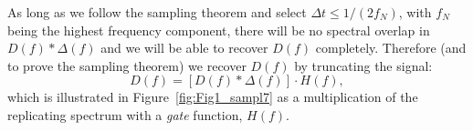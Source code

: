 As long as we follow the sampling theorem and select  $\Delta t \leq 1/(2 f_N)$, with $f_N$ being the highest 
frequency component, there will be no spectral overlap in $D(f)* \Delta (f)$ and we will be able to recover 
$D(f)$ completely.  Therefore (and to prove the sampling theorem) we recover $D(f)$ by truncating the signal:
\begin{equation}
D(f) = [ D (f) * \Delta (f) ] \cdot H(f),
\end{equation}
\noindent
which is illustrated in Figure~\ref{fig:Fig1_sampl7} as a multiplication of the replicating spectrum with a \emph{gate} function, $H(f)$.

